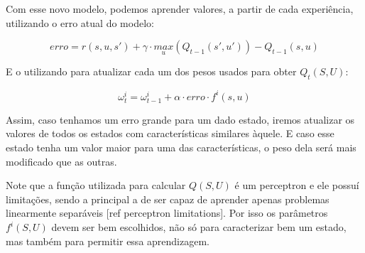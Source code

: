 Com esse novo modelo, podemos aprender valores, a partir de cada experiência, utilizando o erro atual do modelo:

\begin{equation}
	erro = r \left( s, u, s' \right) + \gamma \cdot \underset{u}{max} \left( Q_{t-1} \left( s', u' \right) \right) - Q_{t-1} \left( s, u \right)
\end{equation}

E o utilizando para atualizar cada um dos pesos usados para obter $ Q_t \left( S, U \right) $:

\begin{equation}
	\omega_t^i = \omega_{t-1}^i + \alpha \cdot erro \cdot f^i \left( s, u \right)
\end{equation}

Assim, caso tenhamos um erro grande para um dado estado, iremos atualizar os valores de todos os estados com características similares àquele. E caso esse estado tenha um valor maior para uma das características, o peso dela será mais modificado que as outras.

Note que a função utilizada para calcular $ Q \left( S, U \right) $ é um perceptron e ele possuí limitações, sendo a principal a de ser capaz de aprender apenas problemas linearmente separáveis [ref perceptron limitations]. Por isso os parâmetros $ f^i \left( S, U \right) $ devem ser bem escolhidos, não só para caracterizar bem um estado, mas também para permitir essa aprendizagem.


